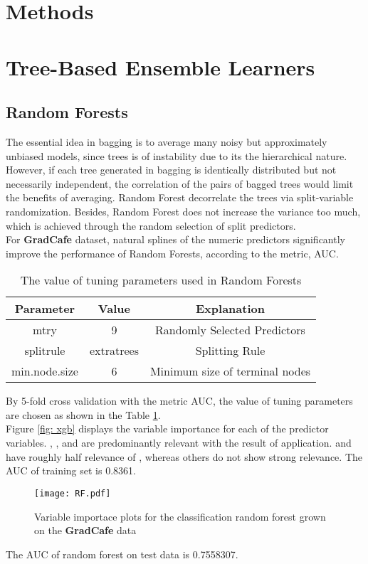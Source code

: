
\section{Methods} \label{sec:methods}
\section{Tree-Based Ensemble Learners} \label{sec: tree}
\subsection{Random Forests} \label{sub: rf}
The essential idea in bagging is to average many noisy but approximately unbiased models, since trees is of instability due to its the hierarchical nature. However, if each tree generated in bagging is identically distributed but not necessarily independent, the correlation of the pairs of bagged trees would limit the benefits of averaging. Random Forest decorrelate the trees via split-variable randomization. Besides, Random Forest does not increase the variance too much, which is achieved through the random selection of split predictors\cite{Friedman:2001:ESL}.\\ 
For \textbf{GradCafe} dataset, natural splines of the numeric predictors significantly improve the performance of Random Forests, according to the metric, AUC. 
\begin{table}[h]
    \centering
    \begin{tabular}{|c|c|c|}
      \hline 
    Parameter & Value & Explanation \\ 
    \hline 
        mtry & 9 & Randomly Selected Predictors\\
    \hline 
        splitrule & extratrees & Splitting Rule \\
        \hline 
        min.node.size & 6 & Minimum size of terminal nodes \\
    \hline 
    \end{tabular}
    \caption{The value of tuning parameters used in Random Forests}
    \label{tab:rf}
\end{table}
By 5-fold cross validation with the metric AUC, the value of tuning parameters are chosen as shown in the Table \ref{tab:rf}. \\
Figure \ref{fig: xgb} displays the variable importance for each of the predictor variables. , , and  are predominantly relevant with the result of application.  and  have roughly half relevance of , whereas others do not show strong relevance. The AUC of training set is 0.8361. 
\begin{figure}[h]
    \centering
    \texttt{[image: RF.pdf]}
    \caption{Variable importace plots for the classification random forest grown on the \textbf{GradCafe} data}
    \label{fig:rf}
\end{figure}
The AUC of random forest on test data is 0.7558307. 

